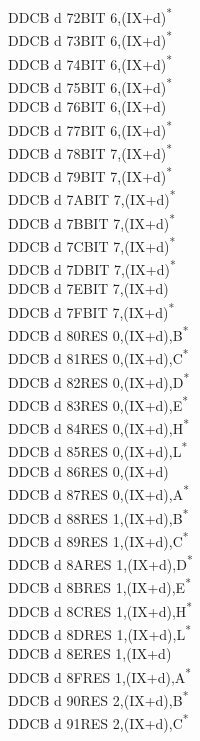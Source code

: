 \documentclass[oneside,a4paper]{book}
\begin{document}
\begin{multicols}{3}
{\begin{tabbing}
DDCB d 72\>BIT 6,(IX+d)\textsuperscript{*}\\
DDCB d 73\>BIT 6,(IX+d)\textsuperscript{*}\\
DDCB d 74\>BIT 6,(IX+d)\textsuperscript{*}\\
DDCB d 75\>BIT 6,(IX+d)\textsuperscript{*}\\
DDCB d 76\>BIT 6,(IX+d)\\
DDCB d 77\>BIT 6,(IX+d)\textsuperscript{*}\\
DDCB d 78\>BIT 7,(IX+d)\textsuperscript{*}\\
DDCB d 79\>BIT 7,(IX+d)\textsuperscript{*}\\
DDCB d 7A\>BIT 7,(IX+d)\textsuperscript{*}\\
DDCB d 7B\>BIT 7,(IX+d)\textsuperscript{*}\\
DDCB d 7C\>BIT 7,(IX+d)\textsuperscript{*}\\
DDCB d 7D\>BIT 7,(IX+d)\textsuperscript{*}\\
DDCB d 7E\>BIT 7,(IX+d)\\
DDCB d 7F\>BIT 7,(IX+d)\textsuperscript{*}\\
DDCB d 80\>RES 0,(IX+d),B\textsuperscript{*}\\
DDCB d 81\>RES 0,(IX+d),C\textsuperscript{*}\\
DDCB d 82\>RES 0,(IX+d),D\textsuperscript{*}\\
DDCB d 83\>RES 0,(IX+d),E\textsuperscript{*}\\
DDCB d 84\>RES 0,(IX+d),H\textsuperscript{*}\\
DDCB d 85\>RES 0,(IX+d),L\textsuperscript{*}\\
DDCB d 86\>RES 0,(IX+d)\\
DDCB d 87\>RES 0,(IX+d),A\textsuperscript{*}\\
DDCB d 88\>RES 1,(IX+d),B\textsuperscript{*}\\
DDCB d 89\>RES 1,(IX+d),C\textsuperscript{*}\\
DDCB d 8A\>RES 1,(IX+d),D\textsuperscript{*}\\
DDCB d 8B\>RES 1,(IX+d),E\textsuperscript{*}\\
DDCB d 8C\>RES 1,(IX+d),H\textsuperscript{*}\\
DDCB d 8D\>RES 1,(IX+d),L\textsuperscript{*}\\
DDCB d 8E\>RES 1,(IX+d)\\
DDCB d 8F\>RES 1,(IX+d),A\textsuperscript{*}\\
DDCB d 90\>RES 2,(IX+d),B\textsuperscript{*}\\
DDCB d 91\>RES 2,(IX+d),C\textsuperscript{*}\\

\end{tabbing}}
\end{multicols}
\end{document}
